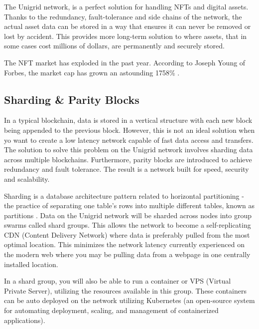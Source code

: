 \documentclass{article}
\begin{document}
The Unigrid network, is a perfect solution for handling NFTs and digital assets. Thanks to the redundancy, fault-tolerance and side chains of the network, the actual asset data can be stored in a way that ensures it can never be removed or lost by accident. This provides more long-term solution to where assets, that in some cases cost millions of dollars, are permanently and securely stored.

The NFT market has exploded in the past year. According to Joseph Young of Forbes, the market cap has grown an astounding 1758\% \cite{young2021}.

\subsection{Sharding \& Parity Blocks}
In a typical blockchain, data is stored in a vertical structure with each new block being appended to the previous block. However, this is not an ideal solution when yo want to create a low latency network capable of fast data access and transfers. The solution to solve this problem on the Unigrid network involves sharding data across multiple blockchains. Furthermore, parity blocks are introduced to achieve redundancy and fault tolerance. The result is a network built for speed, security and scalability.

Sharding is a database architecture pattern related to horizontal partitioning - the practice of separating one table’s rows into multiple different tables, known as partitions \cite{mark2019}. Data on the Unigrid network will be sharded across nodes into group swarms called shard groups. This allows the network to become a self-replicating CDN (Content Delivery Network) where data is preferably pulled from the most optimal location. This minimizes the network latency currently experienced on the modern web where you may be pulling data from a webpage in one centrally installed location.

In a shard group, you will also be able to run a container or VPS (Virtual Private Server), utilizing the resources available in this group. These containers can be auto deployed on the network utilizing Kubernetes (an open-source system for automating deployment, scaling, and management of containerized applications).
\end{document}
